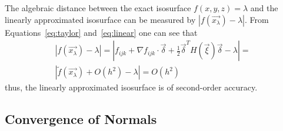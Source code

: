 The algebraic distance between the exact isosurface $f(x,y,z) = \lambda$ and
the linearly approximated isosurface can be measured by 
$|f(\vec{x_\lambda}) - \lambda|$. From Equations~\ref{eq:taylor} and~\ref{eq:linear} one can 
see that
\begin{equation}
\begin{array}{c}
\displaystyle{|f(\vec{x_\lambda}) - \lambda| = |f_{ijk} + \nabla f_{ijk}\cdot \vec{\delta} + \frac{1}{2}\vec{\delta}^T H(\vec{\xi}) \vec{\delta} -\lambda| =}\\
|\tilde{f}(\vec{x_\lambda}) + O(h^2) -\lambda| = O(h^2)
\end{array}
\label{eq:algebraicerror}
\end{equation}
\noindent thus, the linearly approximated isosurface is of second-order accuracy.




\subsection{Convergence of Normals}
\label{chap1:sec:normalconvergence}

